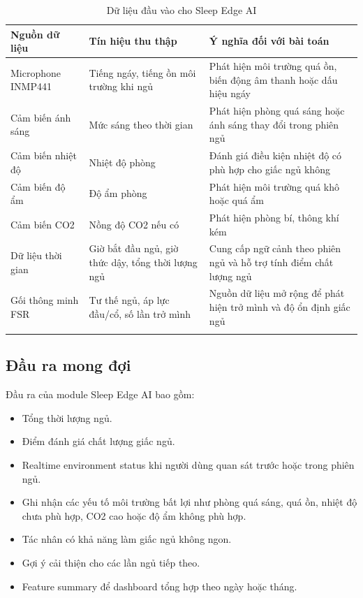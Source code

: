 \documentclass[12pt,a4paper]{article}
\begin{document}
\begin{longtable}{|P{3.3cm}|P{4.5cm}|P{6.5cm}|}
\hline
\textbf{Nguồn dữ liệu} & \textbf{Tín hiệu thu thập} & \textbf{Ý nghĩa đối với bài toán} \\
\hline
Microphone INMP441 & Tiếng ngáy, tiếng ồn môi trường khi ngủ & Phát hiện môi trường quá ồn, biến động âm thanh hoặc dấu hiệu ngáy \\
\hline
Cảm biến ánh sáng & Mức sáng theo thời gian & Phát hiện phòng quá sáng hoặc ánh sáng thay đổi trong phiên ngủ \\
\hline
Cảm biến nhiệt độ & Nhiệt độ phòng & Đánh giá điều kiện nhiệt độ có phù hợp cho giấc ngủ không \\
\hline
Cảm biến độ ẩm & Độ ẩm phòng & Phát hiện môi trường quá khô hoặc quá ẩm \\
\hline
Cảm biến CO2 & Nồng độ CO2 nếu có & Phát hiện phòng bí, thông khí kém \\
\hline
Dữ liệu thời gian & Giờ bắt đầu ngủ, giờ thức dậy, tổng thời lượng ngủ & Cung cấp ngữ cảnh theo phiên ngủ và hỗ trợ tính điểm chất lượng ngủ \\
\hline
Gối thông minh FSR & Tư thế ngủ, áp lực đầu/cổ, số lần trở mình & Nguồn dữ liệu mở rộng để phát hiện trở mình và độ ổn định giấc ngủ \\
\hline
\caption{Dữ liệu đầu vào cho Sleep Edge AI}
\end{longtable}

\subsection{Đầu ra mong đợi}

Đầu ra của module Sleep Edge AI bao gồm:

\begin{itemize}
    \item Tổng thời lượng ngủ.
    \item Điểm đánh giá chất lượng giấc ngủ.
    \item Realtime environment status khi người dùng quan sát trước hoặc trong phiên ngủ.
    \item Ghi nhận các yếu tố môi trường bất lợi như phòng quá sáng, quá ồn, nhiệt độ chưa phù hợp, CO2 cao hoặc độ ẩm không phù hợp.
    \item Tác nhân có khả năng làm giấc ngủ không ngon.
    \item Gợi ý cải thiện cho các lần ngủ tiếp theo.
    \item Feature summary để dashboard tổng hợp theo ngày hoặc tháng.
\end{itemize}
\end{document}
